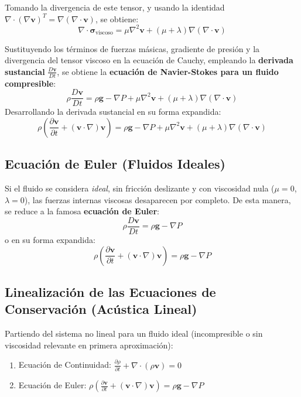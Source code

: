 \documentclass[11pt,letterpaper]{article}
\begin{document}
Tomando la divergencia de este tensor, y usando la identidad $\nabla \cdot (\nabla \mathbf{v})^T = \nabla(\nabla \cdot \mathbf{v})$, se obtiene:
\begin{equation}
    \nabla \cdot \boldsymbol{\sigma}_{\text{viscoso}} = \mu \nabla^2 \mathbf{v} + (\mu + \lambda) \nabla (\nabla \cdot \mathbf{v})
\end{equation}

Sustituyendo los términos de fuerzas másicas, gradiente de presión y la divergencia del tensor viscoso en la ecuación de Cauchy, empleando la \textbf{derivada sustancial} $\frac{D\mathbf{v}}{Dt}$, se obtiene la \textbf{ecuación de Navier-Stokes para un fluido compresible}:
\begin{equation}
    \rho \frac{D\mathbf{v}}{Dt} = \rho \mathbf{g} - \nabla P + \mu \nabla^2 \mathbf{v} + (\mu + \lambda) \nabla (\nabla \cdot \mathbf{v})
\end{equation}
Desarrollando la derivada sustancial en su forma expandida:
\begin{equation}
    \rho \left( \frac{\partial \mathbf{v}}{\partial t} + (\mathbf{v} \cdot \nabla)\mathbf{v} \right) = \rho \mathbf{g} - \nabla P + \mu \nabla^2 \mathbf{v} + (\mu + \lambda) \nabla (\nabla \cdot \mathbf{v})
\end{equation}

\subsection{Ecuación de Euler (Fluidos Ideales)}
Si el fluido se considera \textit{ideal}, sin fricción deslizante y con viscosidad nula ($\mu = 0$, $\lambda = 0$), las fuerzas internas viscosas desaparecen por completo. De esta manera, se reduce a la famosa \textbf{ecuación de Euler}:
\begin{equation}
    \rho \frac{D\mathbf{v}}{Dt} = \rho \mathbf{g} - \nabla P
\end{equation}
o en su forma expandida:
\begin{equation}
    \rho \left( \frac{\partial \mathbf{v}}{\partial t} + (\mathbf{v} \cdot \nabla)\mathbf{v} \right) = \rho \mathbf{g} - \nabla P
\end{equation}

\subsection{Linealización de las Ecuaciones de Conservación (Acústica Lineal)}

Partiendo del sistema no lineal para un fluido ideal (incompresible o sin viscosidad relevante en primera aproximación):
\begin{enumerate}
    \item Ecuación de Continuidad: $\frac{\partial \rho}{\partial t} + \nabla \cdot (\rho \mathbf{v}) = 0$
    \item Ecuación de Euler: $\rho \left( \frac{\partial \mathbf{v}}{\partial t} + (\mathbf{v} \cdot \nabla)\mathbf{v} \right) = \rho \mathbf{g} - \nabla P$
\end{enumerate}
\end{document}

